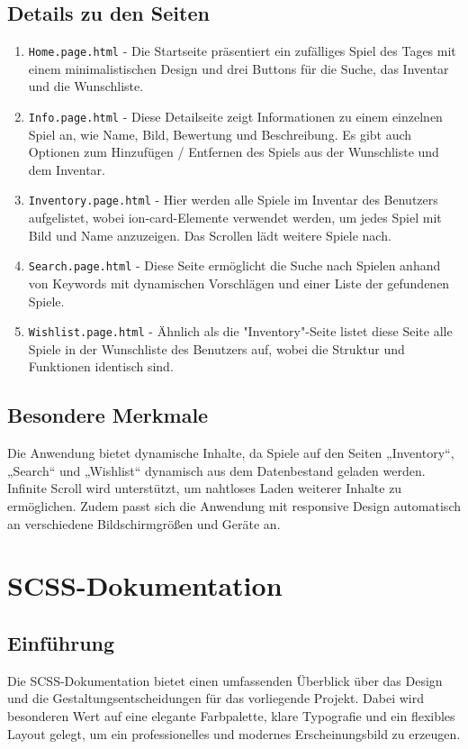 \subsection{Details zu den Seiten}
\begin{enumerate}
    \item \texttt{Home.page.html} - Die Startseite präsentiert ein zufälliges Spiel des Tages mit einem minimalistischen Design und drei Buttons für die Suche, das Inventar und die Wunschliste.
    \item \texttt{Info.page.html} - Diese Detailseite zeigt Informationen zu einem einzelnen Spiel an, wie Name, Bild, Bewertung und Beschreibung. Es gibt auch Optionen zum Hinzufügen / Entfernen des Spiels aus der Wunschliste und dem Inventar.
    \item \texttt{Inventory.page.html} - Hier werden alle Spiele im Inventar des Benutzers aufgelistet, wobei ion-card-Elemente verwendet werden, um jedes Spiel mit Bild und Name anzuzeigen. Das Scrollen lädt weitere Spiele nach.
    \item \texttt{Search.page.html} - Diese Seite ermöglicht die Suche nach Spielen anhand von Keywords mit dynamischen Vorschlägen und einer Liste der gefundenen Spiele.
    \item \texttt{Wishlist.page.html} - Ähnlich als die "Inventory"-Seite listet diese Seite alle Spiele in der Wunschliste des Benutzers auf, wobei die Struktur und Funktionen identisch sind.
\end{enumerate}
\subsection{Besondere Merkmale}
Die Anwendung bietet dynamische Inhalte, da Spiele auf den Seiten „Inventory“, „Search“ und „Wishlist“ dynamisch aus dem Datenbestand geladen werden.
Infinite Scroll wird unterstützt, um nahtloses Laden weiterer Inhalte zu ermöglichen. Zudem passt sich die Anwendung mit responsive Design automatisch an verschiedene Bildschirmgrößen und Geräte an.
\section{SCSS-Dokumentation}
\subsection{Einführung}
Die SCSS-Dokumentation bietet einen umfassenden Überblick über das Design und die Gestaltungsentscheidungen für das vorliegende Projekt.
Dabei wird besonderen Wert auf eine elegante Farbpalette, klare Typografie und ein flexibles Layout gelegt, um ein professionelles und modernes Erscheinungsbild zu erzeugen.
